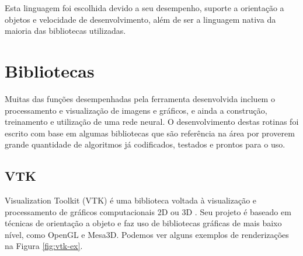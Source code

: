 Esta linguagem foi escolhida devido a seu desempenho, suporte a orientação a objetos e velocidade de desenvolvimento, além de ser a linguagem nativa da maioria das bibliotecas utilizadas.

\section{Bibliotecas}

Muitas das funções desempenhadas pela ferramenta desenvolvida incluem o processamento e visualização de imagens e gráficos, e ainda a construção, treinamento e utilização de uma rede neural. O desenvolvimento destas rotinas foi escrito com base em algumas bibliotecas que são referência na área por proverem grande quantidade de algoritmos já codificados, testados e prontos para o uso.


\subsection{VTK}

Visualization Toolkit (VTK) é uma biblioteca voltada à visualização e processamento de gráficos computacionais 2D ou 3D \cite{vtk}. Seu projeto é baseado em técnicas de orientação a objeto e faz uso de bibliotecas gráficas de mais baixo nível, como OpenGL e Mesa3D. Podemos ver alguns exemplos de renderizações na Figura \ref{fig:vtk-ex}.

